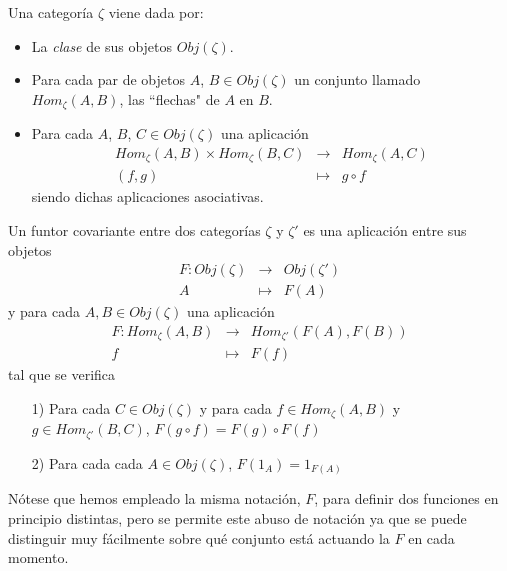 \documentclass[../main.tex]{subfiles}
\begin{document}
Una categoría $\zeta$ viene dada por:\begin{itemize}
    \item La \textit{clase} de sus objetos $Obj(\zeta)$.
    \item Para cada par de objetos $A$, $B\in Obj(\zeta)$ un conjunto llamado $Hom_{\zeta}(A,B)$, las ``flechas" de $A$ en $B$.
    \item Para cada $A$, $B$, $C\in Obj(\zeta)$ una aplicación
    $$\begin{array}{rcl}
    Hom_{\zeta}(A,B)\times Hom_{\zeta}(B,C)&\longrightarrow&Hom_{\zeta}(A,C)\\
    (f,g)&\longmapsto&g\circ f
    \end{array}$$
    siendo dichas aplicaciones asociativas.
\end{itemize}
\begin{definition} Un funtor covariante entre dos categorías $\zeta$ y $\zeta '$ es una aplicación entre sus objetos
 $$\begin{array}{rcl}
    F: Obj(\zeta)&\longrightarrow&Obj(\zeta ')\\
    A&\longmapsto&F(A)
    \end{array}$$
y para cada $A,B\in Obj(\zeta)$ una aplicación
$$\begin{array}{rcl}
    F: Hom_{\zeta}(A,B)&\longrightarrow&Hom_{\zeta '}(F(A),F(B))\\
    f&\longmapsto&F(f)
    \end{array}$$
tal que se verifica \begin{itemize}
    \item [1)] Para cada $C\in Obj(\zeta)$ y para cada $f\in Hom_{\zeta}(A,B)$ y $g\in Hom_{\zeta '}(B,C)$, $F(g\circ f)=F(g)\circ F(f)$
    \item [2)] Para cada cada $A\in Obj(\zeta)$, $F(1_A)=1_{F(A)}$
\end{itemize}
\end{definition}
Nótese que hemos empleado la misma notación, $F$, para definir dos funciones en principio distintas, pero se permite este abuso de notación ya que se puede distinguir muy fácilmente sobre qué conjunto está actuando la $F$ en cada momento.
\end{document}
